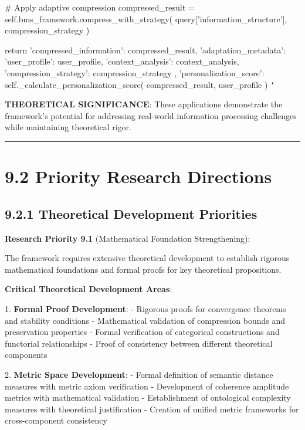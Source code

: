         \# Apply adaptive compression
        compressed_result = self.bms_framework.compress_with_strategy(
            query['information_structure'], compression_strategy
        )
        
        return {
            'compressed_information': compressed_result,
            'adaptation_metadata': {
                'user_profile': user_profile,
                'context_analysis': context_analysis,
                'compression_strategy': compression_strategy
            },
            'personalization_score': self._calculate_personalization_score(
                compressed_result, user_profile
            )
        }
\texttt{`}

\textbf{THEORETICAL SIGNIFICANCE}: These applications demonstrate the framework's potential for addressing real-world information processing challenges while maintaining theoretical rigor.

\hrule

\section{9.2 Priority Research Directions}

\subsection{9.2.1 Theoretical Development Priorities}

\textbf{Research Priority 9.1} (Mathematical Foundation Strengthening):

The framework requires extensive theoretical development to establish rigorous mathematical foundations and formal proofs for key theoretical propositions.

\textbf{Critical Theoretical Development Areas}:

1. \textbf{Formal Proof Development}:
   - Rigorous proofs for convergence theorems and stability conditions
   - Mathematical validation of compression bounds and preservation properties
   - Formal verification of categorical constructions and functorial relationships
   - Proof of consistency between different theoretical components

2. \textbf{Metric Space Development}:
   - Formal definition of semantic distance measures with metric axiom verification
   - Development of coherence amplitude metrics with mathematical validation
   - Establishment of ontological complexity measures with theoretical justification
   - Creation of unified metric frameworks for cross-component consistency

